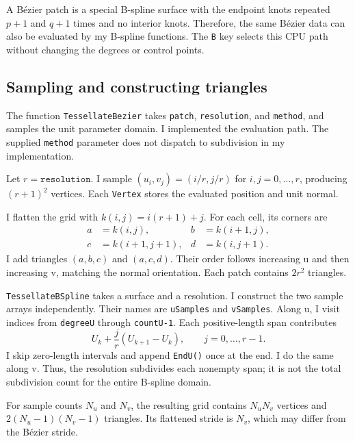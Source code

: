 \documentclass[acmtog]{acmart}
\begin{document}
A B\'ezier patch is a special B-spline surface with the endpoint knots repeated $p+1$ and $q+1$ times and no interior knots. Therefore, the same B\'ezier data can also be evaluated by my B-spline functions. The \texttt{B} key selects this CPU path without changing the degrees or control points.

\subsection{Sampling and constructing triangles}
The function \texttt{TessellateBezier} takes \texttt{patch}, \texttt{resolution}, and \texttt{method}, and samples the unit parameter domain. I implemented the evaluation path. The supplied \texttt{method} parameter does not dispatch to subdivision in my implementation.

Let $r=\texttt{resolution}$. I sample $(u_i,v_j)=(i/r,j/r)$ for $i,j=0,\ldots,r$, producing $(r+1)^2$ vertices. Each \texttt{Vertex} stores the evaluated position and unit normal.

I flatten the grid with $k(i,j)=i(r+1)+j$. For each cell, its corners are
\begin{equation}
\begin{aligned}
a&=k(i,j),&b&=k(i+1,j),\\
c&=k(i+1,j+1),&d&=k(i,j+1).
\end{aligned}
\end{equation}
I add triangles $(a,b,c)$ and $(a,c,d)$. Their order follows increasing u and then increasing v, matching the normal orientation. Each patch contains $2r^2$ triangles.

\texttt{TessellateBSpline} takes a surface and a resolution. I construct the two sample arrays independently. Their names are \texttt{uSamples} and \texttt{vSamples}. Along u, I visit indices from \texttt{degreeU} through \texttt{countU-1}. Each positive-length span contributes
\begin{equation}
U_k+\frac{j}{r}(U_{k+1}-U_k),
\qquad j=0,\ldots,r-1.
\end{equation}
I skip zero-length intervals and append \texttt{EndU()} once at the end. I do the same along v. Thus, the resolution subdivides each nonempty span; it is not the total subdivision count for the entire B-spline domain.

For sample counts $N_u$ and $N_v$, the resulting grid contains $N_uN_v$ vertices and $2(N_u-1)(N_v-1)$ triangles. Its flattened stride is $N_v$, which may differ from the B\'ezier stride.
\end{document}

